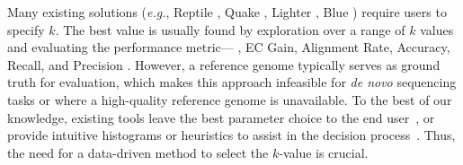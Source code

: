 Many existing solutions (\textit{e.g.}, Reptile \cite{yang2010reptile}, Quake \cite{kelley2010quake}, Lighter \cite{song2014lighter}, Blue \cite{greenfield2014blue}) require users to specify $k$. The best value is usually found by exploration over a range of $k$ values \cite{kao2011echo} and evaluating the performance metric--- \eg, EC Gain, Alignment Rate, Accuracy, Recall, and Precision \cite{heydari2017evaluation}.
However, a reference genome typically serves as ground truth for evaluation, which makes this approach infeasible for \textit{de novo} sequencing tasks or where a high-quality reference genome is unavailable. 
To the best of our knowledge, existing tools leave the best parameter choice to the end user~\cite{peng2010idba, mahadik2017scalable}, or provide intuitive histograms or heuristics to assist in the decision process~\cite{chikhi2013informed}. Thus, the need for a data-driven method to select the $k$-value is crucial.
  
